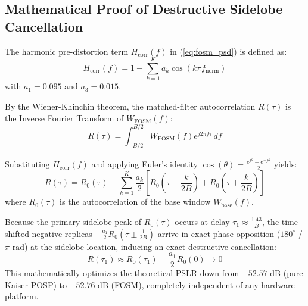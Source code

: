 \documentclass[journal,compsoc]{IEEEtran}
\begin{document}
\subsection{Mathematical Proof of Destructive Sidelobe Cancellation}
The harmonic pre-distortion term $H_{\text{corr}}(f)$ in (\ref{eq:fosm_psd}) is defined as:
\begin{equation}
H_{\text{corr}}(f) = 1 - \sum_{k=1}^{K} a_k \cos\left(k \pi f_{\text{norm}}\right)
\end{equation}
with $a_1 = 0.095$ and $a_3 = 0.015$.

By the Wiener-Khinchin theorem, the matched-filter autocorrelation $R(\tau)$ is the Inverse Fourier Transform of $W_{\text{FOSM}}(f)$:
\begin{equation}
R(\tau) = \int_{-B/2}^{B/2} W_{\text{FOSM}}(f) e^{j 2\pi f \tau} \, df
\end{equation}

Substituting $H_{\text{corr}}(f)$ and applying Euler's identity $\cos(\theta) = \frac{e^{j\theta} + e^{-j\theta}}{2}$ yields:
\begin{equation}
R(\tau) = R_0(\tau) - \sum_{k=1}^{K} \frac{a_k}{2} \left[ R_0\left(\tau - \frac{k}{2B}\right) + R_0\left(\tau + \frac{k}{2B}\right) \right]
\label{eq:destructive_cancellation}
\end{equation}
where $R_0(\tau)$ is the autocorrelation of the base window $W_{\text{base}}(f)$. 

Because the primary sidelobe peak of $R_0(\tau)$ occurs at delay $\tau_1 \approx \frac{1.43}{B}$, the time-shifted negative replicas $-\frac{a_1}{2} R_0(\tau \pm \frac{1}{2B})$ arrive in exact phase opposition ($180^\circ$ / $\pi\text{ rad}$) at the sidelobe location, inducing an exact destructive cancellation:
\begin{equation}
R(\tau_1) \approx R_0(\tau_1) - \frac{a_1}{2} R_0(0) \longrightarrow 0
\end{equation}
This mathematically optimizes the theoretical PSLR down from $-52.57\text{ dB}$ (pure Kaiser-POSP) to $-52.76\text{ dB}$ (FOSM), completely independent of any hardware platform.
\end{document}
